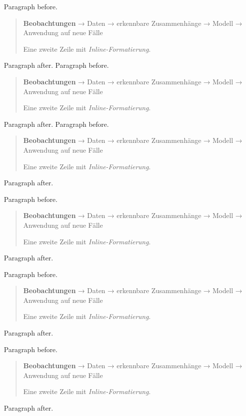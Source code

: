 Paragraph before.

\begin{quote}
\textbf{Beobachtungen} → Daten → erkennbare Zusammenhänge → Modell → Anwendung auf neue Fälle

Eine zweite Zeile mit \emph{Inline-Formatierung}.
\end{quote}

Paragraph after.
Paragraph before.

\begin{quote}
\textbf{Beobachtungen} → Daten → erkennbare Zusammenhänge → Modell → Anwendung auf neue Fälle

Eine zweite Zeile mit \emph{Inline-Formatierung}.
\end{quote}

Paragraph after.
Paragraph before.

\begin{quote}
\textbf{Beobachtungen} → Daten → erkennbare Zusammenhänge → Modell → Anwendung auf neue Fälle

Eine zweite Zeile mit \emph{Inline-Formatierung}.
\end{quote}

Paragraph after.
\begin{frame}[t]
Paragraph before.

\begin{quote}
\textbf{Beobachtungen} → Daten → erkennbare Zusammenhänge → Modell → Anwendung auf neue Fälle

Eine zweite Zeile mit \emph{Inline-Formatierung}.
\end{quote}

Paragraph after.
\end{frame}

\begin{frame}[t]
Paragraph before.

\begin{quote}
\textbf{Beobachtungen} → Daten → erkennbare Zusammenhänge → Modell → Anwendung auf neue Fälle

Eine zweite Zeile mit \emph{Inline-Formatierung}.
\end{quote}

Paragraph after.
\end{frame}

\begin{frame}[t]
Paragraph before.

\begin{quote}
\textbf{Beobachtungen} → Daten → erkennbare Zusammenhänge → Modell → Anwendung auf neue Fälle

Eine zweite Zeile mit \emph{Inline-Formatierung}.
\end{quote}

Paragraph after.
\end{frame}

